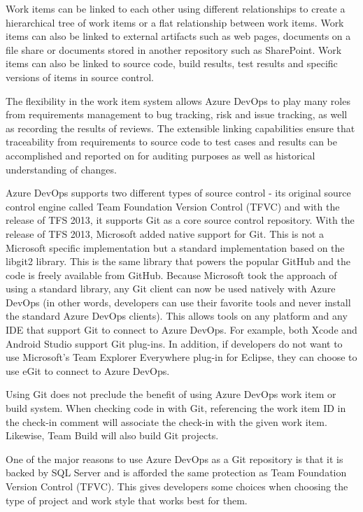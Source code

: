 \documentclass[10pt,oneside,a4paper]{article}
\begin{document}
Work items can be linked to each other using different relationships to create a hierarchical tree of work items or a flat relationship between work items. Work items can also be linked to external artifacts such as web pages, documents on a file share or documents stored in another repository such as SharePoint. Work items can also be linked to source code, build results, test results and specific versions of items in source control.

The flexibility in the work item system allows Azure DevOps to play many roles from requirements management to bug tracking, risk and issue tracking, as well as recording the results of reviews. The extensible linking capabilities ensure that traceability from requirements to source code to test cases and results can be accomplished and reported on for auditing purposes as well as historical understanding of changes.

Azure DevOps supports two different types of source control - its original source control engine called Team Foundation Version Control (TFVC) and with the release of TFS 2013, it supports Git as a core source control repository.
With the release of TFS 2013, Microsoft added native support for Git. This is not a Microsoft specific implementation but a standard implementation based on the libgit2 library. This is the same library that powers the popular GitHub and the code is freely available from GitHub. Because Microsoft took the approach of using a standard library, any Git client can now be used natively with Azure DevOps (in other words, developers can use their favorite tools and never install the standard Azure DevOps clients). This allows tools on any platform and any IDE that support Git to connect to Azure DevOps. For example, both Xcode and Android Studio support Git plug-ins. In addition, if developers do not want to use Microsoft's Team Explorer Everywhere plug-in for Eclipse, they can choose to use eGit to connect to Azure DevOps.

Using Git does not preclude the benefit of using Azure DevOps work item or build system. When checking code in with Git, referencing the work item ID in the check-in comment will associate the check-in with the given work item. Likewise, Team Build will also build Git projects.

One of the major reasons to use Azure DevOps as a Git repository is that it is backed by SQL Server and is afforded the same protection as Team Foundation Version Control (TFVC). This gives developers some choices when choosing the type of project and work style that works best for them.


 
\end{document}
